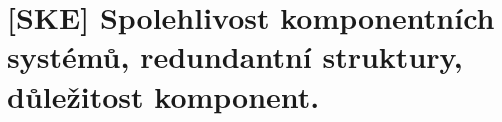 \chapter{[SKE] Spolehlivost komponentních systémů, redundantní struktury, důležitost komponent.}





